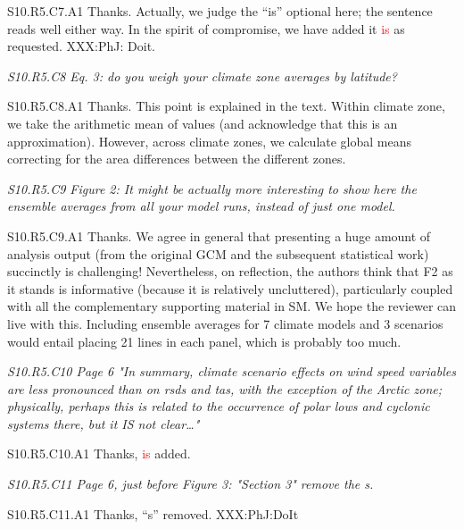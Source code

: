\documentclass[a4paper,10pt]{article}
\newcommand{\ed}[1]{\textcolor{red}{#1}}
\begin{document}
	S10.R5.C7.A1 Thanks. Actually, we judge the ``is'' optional here; the sentence reads well either way. In the spirit of compromise, we have added it \ed{is} as requested. XXX:PhJ: Doit.
	
	\emph{S10.R5.C8 Eq. 3: do you weigh your climate zone averages by latitude?}

	S10.R5.C8.A1 Thanks. This point is explained in the text. Within climate zone, we take the arithmetic mean of values (and acknowledge that this is an approximation). However, across climate zones, we calculate global means correcting for the area differences between the different zones.

	\emph{S10.R5.C9 Figure 2: It might be actually more interesting to show here the ensemble averages from all your model runs, instead of just one model.}

	S10.R5.C9.A1 Thanks. We agree in general that presenting a huge amount of analysis output (from the original GCM and the subsequent statistical work) succinctly is challenging! Nevertheless, on reflection, the authors think that F2 as it stands is informative (because it is relatively uncluttered), particularly coupled with all the complementary supporting material in SM. We hope the reviewer can live with this. Including ensemble averages for 7 climate models and 3 scenarios would entail placing 21 lines in each panel, which is probably too much.

	\emph{S10.R5.C10 Page 6 "In summary, climate scenario effects on wind speed variables are less pronounced than on rsds and tas, with the exception of the Arctic zone; physically, perhaps this is related to the occurrence of polar lows and cyclonic systems there, but it IS not clear…"}

	S10.R5.C10.A1 Thanks, \ed{is} added.

	\emph{S10.R5.C11 Page 6, just before Figure 3: "Section 3" remove the s.}

	S10.R5.C11.A1 Thanks, ``s'' removed. XXX:PhJ:DoIt

	
	
	
\end{document}

